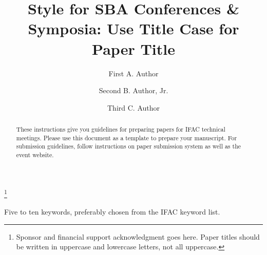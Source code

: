 \documentclass[a4paper]{ifacconf}
\begin{document}
\else
% 

\begin{frontmatter}

\title{Style for SBA Conferences \& Symposia: Use Title Case for
  Paper Title} 

\thanks[footnoteinfo]{Sponsor and financial support acknowledgment
goes here. Paper titles should be written in uppercase and lowercase
letters, not all uppercase.}

\author[First]{First A. Author} 
\author[Second]{Second B. Author, Jr.} 
\author[Third]{Third C. Author}


\address[First]{Instituto Federal de Educação, Ciência e Tecnologia de Goiás, Câmpus Goiânia, GO (e-mail: autor1@faceg@univt.br).}
\address[Second]{Faculdade de Engenharia de Controle \& Automação, Universidade do Futuro, RJ (e-mail: autor2@feca.unifutu.rj)}
\address[Third]{Electrical Engineering Department, 
   Seoul National University, Seoul, Korea, (e-mail: author3@snu.ac.kr)}
   
\renewcommand{\abstractname}{{\bf Abstract:~}}   
   
\begin{abstract}                %
These instructions give you guidelines for preparing papers for IFAC
technical meetings. Please use this document as a template to prepare
your manuscript. For submission guidelines, follow instructions on
paper submission system as well as the event website.
\end{abstract}

\begin{keyword}
Five to ten keywords, preferably chosen from the IFAC keyword list.
\end{keyword}

\end{frontmatter}
\fi





\end{document}
